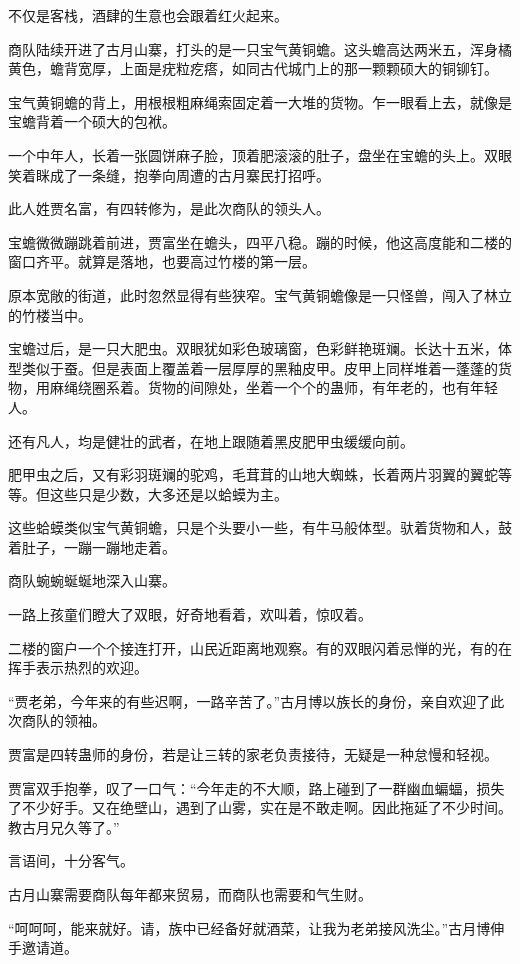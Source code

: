 \begin{this_body}
不仅是客栈，酒肆的生意也会跟着红火起来。

商队陆续开进了古月山寨，打头的是一只宝气黄铜蟾。这头蟾高达两米五，浑身橘黄色，蟾背宽厚，上面是疣粒疙瘩，如同古代城门上的那一颗颗硕大的铜铆钉。

宝气黄铜蟾的背上，用根根粗麻绳索固定着一大堆的货物。乍一眼看上去，就像是宝蟾背着一个硕大的包袱。

一个中年人，长着一张圆饼麻子脸，顶着肥滚滚的肚子，盘坐在宝蟾的头上。双眼笑着眯成了一条缝，抱拳向周遭的古月寨民打招呼。

此人姓贾名富，有四转修为，是此次商队的领头人。

宝蟾微微蹦跳着前进，贾富坐在蟾头，四平八稳。蹦的时候，他这高度能和二楼的窗口齐平。就算是落地，也要高过竹楼的第一层。

原本宽敞的街道，此时忽然显得有些狭窄。宝气黄铜蟾像是一只怪兽，闯入了林立的竹楼当中。

宝蟾过后，是一只大肥虫。双眼犹如彩色玻璃窗，色彩鲜艳斑斓。长达十五米，体型类似于蚕。但是表面上覆盖着一层厚厚的黑釉皮甲。皮甲上同样堆着一蓬蓬的货物，用麻绳绕圈系着。货物的间隙处，坐着一个个的蛊师，有年老的，也有年轻人。

还有凡人，均是健壮的武者，在地上跟随着黑皮肥甲虫缓缓向前。

肥甲虫之后，又有彩羽斑斓的驼鸡，毛茸茸的山地大蜘蛛，长着两片羽翼的翼蛇等等。但这些只是少数，大多还是以蛤蟆为主。

这些蛤蟆类似宝气黄铜蟾，只是个头要小一些，有牛马般体型。驮着货物和人，鼓着肚子，一蹦一蹦地走着。

商队蜿蜿蜒蜒地深入山寨。

一路上孩童们瞪大了双眼，好奇地看着，欢叫着，惊叹着。

二楼的窗户一个个接连打开，山民近距离地观察。有的双眼闪着忌惮的光，有的在挥手表示热烈的欢迎。

“贾老弟，今年来的有些迟啊，一路辛苦了。”古月博以族长的身份，亲自欢迎了此次商队的领袖。

贾富是四转蛊师的身份，若是让三转的家老负责接待，无疑是一种怠慢和轻视。

贾富双手抱拳，叹了一口气：“今年走的不大顺，路上碰到了一群幽血蝙蝠，损失了不少好手。又在绝壁山，遇到了山雾，实在是不敢走啊。因此拖延了不少时间。教古月兄久等了。”

言语间，十分客气。

古月山寨需要商队每年都来贸易，而商队也需要和气生财。

“呵呵呵，能来就好。请，族中已经备好就酒菜，让我为老弟接风洗尘。”古月博伸手邀请道。


\end{this_body}

